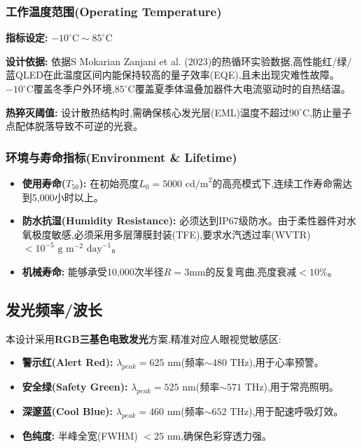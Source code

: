 \documentclass[12pt,a4paper]{article}
\begin{document}
\subsubsection{工作温度范围(Operating Temperature)}

\textbf{指标设定:} $-10^{\circ}\text{C} \sim 85^{\circ}\text{C}$

\textbf{设计依据:} 依据S Mokarian Zanjani et al. (2023)的热循环实验数据,高性能红/绿/蓝QLED在此温度区间内能保持较高的量子效率(EQE),且未出现灾难性故障\cite{haghighi2023investigation}。$-10^{\circ}\text{C}$覆盖冬季户外环境,$85^{\circ}\text{C}$覆盖夏季体温叠加器件大电流驱动时的自热结温。

\textbf{热猝灭阈值:} 设计散热结构时,需确保核心发光层(EML)温度不超过$90^{\circ}\text{C}$,防止量子点配体脱落导致不可逆的光衰。

\subsubsection{环境与寿命指标(Environment \& Lifetime)}

\begin{itemize}
    \item \textbf{使用寿命($T_{50}$):} 在初始亮度$L_0 = 5000 \text{ cd/m}^2$的高亮模式下,连续工作寿命需达到5,000小时以上。
    
    \item \textbf{防水抗湿(Humidity Resistance):} 必须达到IP67级防水。由于柔性器件对水氧极度敏感,必须采用多层薄膜封装(TFE),要求水汽透过率(WVTR) $< 10^{-5} \text{ g m}^{-2} \text{ day}^{-1}$\cite{lee2023truly}。
    
    \item \textbf{机械寿命:} 能够承受10,000次半径$R=3\text{mm}$的反复弯曲,亮度衰减$< 10\%$。
\end{itemize}

\subsection{发光频率/波长}

本设计采用\textbf{RGB三基色电致发光}方案,精准对应人眼视觉敏感区:

\begin{itemize}
    \item \textbf{警示红(Alert Red):} $\lambda_{peak} = 625 \text{ nm}$(频率$\sim 480 \text{ THz}$),用于心率预警。
    
    \item \textbf{安全绿(Safety Green):} $\lambda_{peak} = 525 \text{ nm}$(频率$\sim 571 \text{ THz}$),用于常亮照明。
    
    \item \textbf{深邃蓝(Cool Blue):} $\lambda_{peak} = 460 \text{ nm}$(频率$\sim 652 \text{ THz}$),用于配速呼吸灯效。
    
    \item \textbf{色纯度:} 半峰全宽(FWHM) $< 25 \text{ nm}$,确保色彩穿透力强。
\end{itemize}
\end{document}

